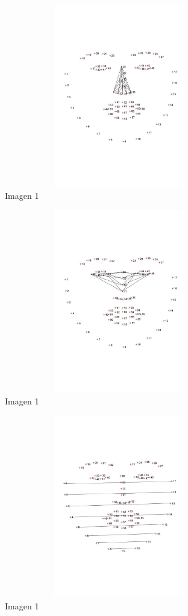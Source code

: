 \documentclass{article}
\begin{document}
\begin{figure}[H]
  \centering
  \includegraphics[width=100mm, height=80mm]{images/nasal_septum_distances.jpg}
  \caption{Imagen 1}
\end{figure}
  
\begin{figure}[H]
  \centering
  \includegraphics[width=100mm, height=80mm]{images/nose_distances.jpg}
  \caption{Imagen 1}
\end{figure} 
  
\begin{figure}[H]
  \centering
  \includegraphics[width=100mm, height=80mm]{images/width_distances.jpg}
  \caption{Imagen 1}
\end{figure}
\end{document}
